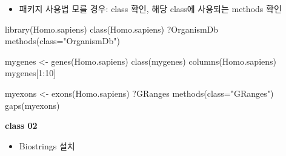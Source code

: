 \documentclass[
]{book}
\newenvironment{Shaded}{\begin{snugshade}}{\end{snugshade}}
\newcommand{\AttributeTok}[1]{\textcolor[rgb]{0.77,0.63,0.00}{#1}}
\newcommand{\DecValTok}[1]{\textcolor[rgb]{0.00,0.00,0.81}{#1}}
\newcommand{\FunctionTok}[1]{\textcolor[rgb]{0.00,0.00,0.00}{#1}}
\newcommand{\NormalTok}[1]{#1}
\newcommand{\OtherTok}[1]{\textcolor[rgb]{0.56,0.35,0.01}{#1}}
\newcommand{\SpecialCharTok}[1]{\textcolor[rgb]{0.00,0.00,0.00}{#1}}
\newcommand{\StringTok}[1]{\textcolor[rgb]{0.31,0.60,0.02}{#1}}
\providecommand{\tightlist}{%
  \setlength{\itemsep}{0pt}\setlength{\parskip}{0pt}}
\begin{document}
\begin{itemize}
\tightlist
\item
  패키지 사용법 모를 경우: class 확인, 해당 class에 사용되는 methods 확인
\end{itemize}

\begin{Shaded}
\begin{Highlighting}[]

\FunctionTok{library}\NormalTok{(Homo.sapiens)}
\FunctionTok{class}\NormalTok{(Homo.sapiens)}
\NormalTok{?OrganismDb}
\FunctionTok{methods}\NormalTok{(}\AttributeTok{class=}\StringTok{"OrganismDb"}\NormalTok{)}

\NormalTok{mygenes }\OtherTok{\textless{}{-}} \FunctionTok{genes}\NormalTok{(Homo.sapiens)}
\FunctionTok{class}\NormalTok{(mygenes)}
\FunctionTok{columns}\NormalTok{(Homo.sapiens)}
\NormalTok{mygenes[}\DecValTok{1}\SpecialCharTok{:}\DecValTok{10}\NormalTok{]}

\NormalTok{myexons }\OtherTok{\textless{}{-}} \FunctionTok{exons}\NormalTok{(Homo.sapiens)}
\NormalTok{?GRanges}
\FunctionTok{methods}\NormalTok{(}\AttributeTok{class=}\StringTok{"GRanges"}\NormalTok{)}
\FunctionTok{gaps}\NormalTok{(myexons)}
\end{Highlighting}
\end{Shaded}

\textbf{class 02}

\begin{itemize}
\tightlist
\item
  Biostrings 설치
\end{itemize}
\end{document}
